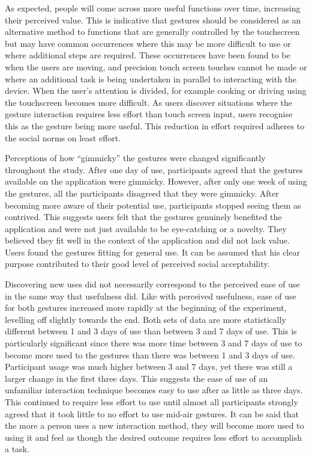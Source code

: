 \documentclass{l4proj}
\begin{document}
As expected, people will come across more useful functions over time, increasing their perceived value. This is indicative that gestures should be considered as an alternative method to functions that are generally controlled by the touchscreen but may have common occurrences where this may be more difficult to use or where additional steps are required. These occurrences have been found to be when the users are moving, and precision touch screen touches cannot be made or where an additional task is being undertaken in parallel to interacting with the device. When the user’s attention is divided, for example cooking or driving using the touchscreen becomes more difficult. As users discover situations where the gesture interaction requires less effort than touch screen input, users recognise this as the gesture being more useful. This reduction in effort required adheres to the social norms on least effort.

Perceptions of how ``gimmicky'' the gestures were changed significantly throughout the study. After one day of use, participants agreed that the gestures available on the application were gimmicky. However, after only one week of using the gestures, all the participants disagreed that they were gimmicky. After becoming more aware of their potential use, participants stopped seeing them as contrived. This suggests users felt that the gestures genuinely benefited the application and were not just available to be eye-catching or a novelty. They believed they fit well in the context of the application and did not lack value. Users found the gestures fitting for general use. It can be assumed that his clear purpose contributed to their good level of perceived social acceptability.

Discovering new uses did not necessarily correspond to the perceived ease of use in the same way that usefulness did. Like with perceived usefulness, ease of use for both gestures increased more rapidly at the beginning of the experiment, levelling off slightly towards the end. Both sets of data are more statistically different between 1 and 3 days of use than between 3 and 7 days of use. This is particularly significant since there was more time between 3 and 7 days of use to become more used to the gestures than there was between 1 and 3 days of use. Participant usage was much higher between 3 and 7 days, yet there was still a larger change in the first three days. This suggests the ease of use of an unfamiliar interaction technique becomes easy to use after as little as three days. This continued to require less effort to use until almost all participants strongly agreed that it took little to no effort to use mid-air gestures. It can be said that the more a person uses a new interaction method, they will become more used to using it and feel as though the desired outcome requires less effort to accomplish a task.
\end{document}
